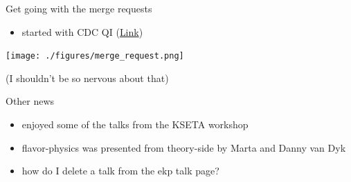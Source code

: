 \documentclass[presentation]{etp-beamer-fancy}
\begin{document}
\begin{frame}[label={sec:org1adf287}]{Get going with the merge requests}
\begin{itemize}
\item started with CDC QI (\href{https://stash.desy.de/projects/B2/repos/software/pull-requests/3633}{Link})
\end{itemize}
\begin{center}
\texttt{[image: ./figures/merge\_request.png]}
\end{center}
(I shouldn't be so nervous about that)
\end{frame}

\begin{frame}[label={sec:org431814e}]{Other news}
\begin{itemize}
\item enjoyed some of the talks from the KSETA workshop
\item flavor-physics was presented from theory-side by Marta and Danny van Dyk
\item how do I delete a talk from the ekp talk page?
\end{itemize}
\end{frame}
\end{document}
